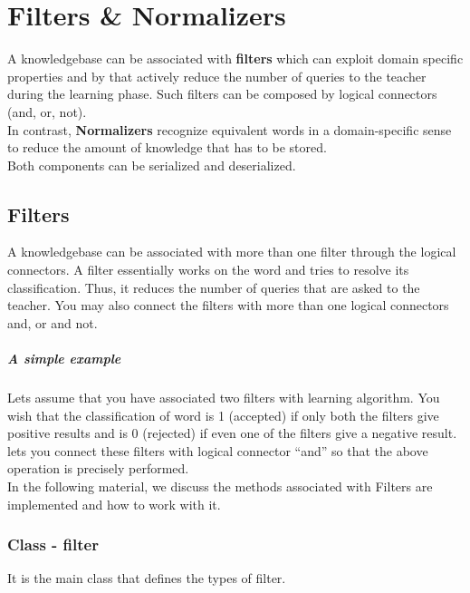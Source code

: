\chapter{Filters \& Normalizers}
A knowledgebase can be associated with \textbf{filters} which can exploit domain specific properties and by that actively reduce the number of queries to the teacher during the learning phase. Such filters can be composed by logical connectors (and, or, not). \\
In contrast, \textbf{Normalizers} recognize equivalent words in a domain-specific sense to reduce the amount of knowledge that has to be stored. \\
Both components can be serialized and deserialized.

\section{Filters}

A knowledgebase can be associated with more than one filter through the logical connectors. A filter essentially works on the word and tries to resolve its classification. Thus, it reduces the number of queries that are asked to the teacher. You may also connect the filters with more than one logical connectors and, or and not.
\paragraph{A simple example}
Lets assume that you have associated two filters with learning algorithm. You wish that the classification of word is 1 (accepted) if only both the filters give positive results and is 0 (rejected) if even one of the filters give a negative result. \libalf lets you connect these filters with logical connector ``and'' so that the above operation is precisely performed. \\
In the following material, we discuss the methods associated with Filters are implemented and how to work with it.

\subsection{Class - filter}
It is the main class that defines the types of filter.

